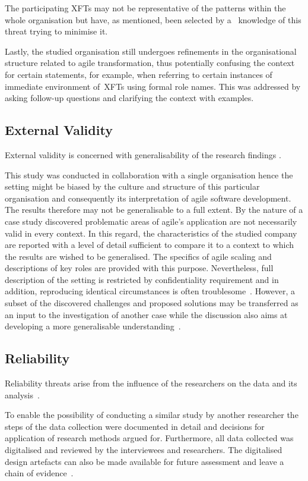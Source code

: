 The participating \acp{XFT} may not be representative of the patterns within the whole organisation but have, as mentioned, been selected by a~ knowledge of this threat trying to minimise it.

Lastly, the studied organisation still undergoes refinements in the organisational structure related to agile transformation, thus potentially confusing the context for certain statements, for example, when referring to certain instances of immediate environment of~\acp{XFT} using formal role names. This was addressed by asking follow-up questions and clarifying the context with examples.

\subsection{External Validity}

External validity is concerned with generalisability of the research findings \citep{runeson}.

This study was conducted in collaboration with a single organisation hence the setting might be biased by the culture and structure of this particular organisation and consequently its interpretation of agile software development. The results therefore may not be generalisable to a full extent. By the nature of a case study discovered problematic areas of agile's application are not necessarily valid in every context. In this regard, the characteristics of the studied company are reported with a level of detail sufficient to compare it to a context to which the results are wished to be generalised. The specifics of agile scaling and descriptions of key roles are provided with this purpose. Nevertheless, full description of the setting is restricted by confidentiality requirement and in addition, reproducing identical circumstances is often troublesome~\citep{rbs2011prio}. However, a subset of the discovered challenges and proposed solutions may be transferred as an input to the investigation of another case while the discussion also aims at developing a more generalisable understanding~\citep{rbs2011prio}.
 
\subsection{Reliability}

Reliability threats arise from the influence of the researchers on the data and its analysis~\citep{runeson}.

To enable the possibility of conducting a similar study by another researcher the steps of the data collection were documented in detail and decisions for application of research methods argued for. Furthermore, all data collected was digitalised and reviewed by the interviewees and researchers. The digitalised design artefacts can also be made available for future assessment and leave a chain of evidence~\citep{runeson}.

